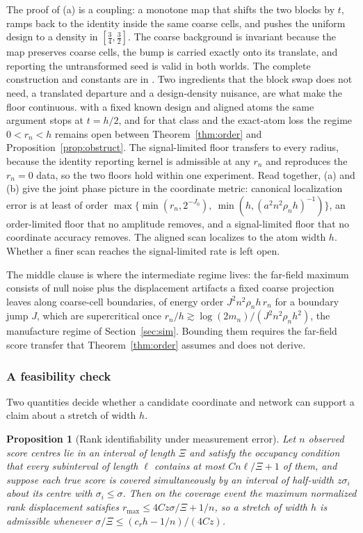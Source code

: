 \documentclass[11pt]{article}
\newtheorem{proposition}[theorem]{Proposition}
\theoremstyle{definition}
\newcommand{\1}{\mathbf 1}\newcommand{\op}{\operatorname}
\begin{document}
The proof of (a) is a coupling: a monotone map that shifts the two blocks by
$t$, ramps back to the identity inside the same coarse cells, and pushes the
uniform design to a density in $[\tfrac34,\tfrac32]$.  The coarse background is
invariant because the map preserves coarse cells, the bump is carried exactly
onto its translate, and reporting the untransformed seed is valid in both
worlds.  The complete construction and constants are in .  Two ingredients that the block swap does not need, a translated
departure and a design-density nuisance, are what make the floor continuous.
with a fixed known design and aligned atoms the same argument stops at $t=h/2$,
and for that class and the exact-atom loss the regime $0<r_n<h$ remains open
between Theorem~\ref{thm:order} and Proposition~\ref{prop:obstruct}.  The signal-limited floor transfers to every radius, because the identity
reporting kernel is admissible at any $r_n$ and reproduces the $r_n=0$ data,
so the two floors hold within one experiment.  Read together, (a) and (b)
give the joint phase picture in the coordinate metric:
canonical localization error is at least of order
$\max\{\min(r_n,2^{-J_0}),\ \min(h,(a^2n^2\rho_nh)^{-1})\}$, an order-limited
floor that no amplitude removes, and a signal-limited floor that no coordinate
accuracy removes.  The aligned scan localizes to the atom width $h$.  Whether a
finer scan reaches the signal-limited rate is left open.



The middle clause is where the intermediate regime lives: the far-field
maximum consists of null noise plus the displacement artifacts a fixed coarse
projection leaves along coarse-cell boundaries, of energy order
$J^2n^2\rho_nh\,r_n$ for a boundary jump $J$, which are supercritical once
$r_n/h\gtrsim\log(2m_n)/(J^2n^2\rho_nh^2)$, the manufacture regime of
Section~\ref{sec:sim}.  Bounding them requires the far-field score transfer
that Theorem~\ref{thm:order} assumes and does not derive.

\subsubsection{A feasibility check}

Two quantities decide whether a candidate coordinate and network can support a
claim about a stretch of width $h$.

\begin{proposition}[Rank identifiability under measurement error]
\label{prop:packing}
Let $n$ observed score centres lie in an interval of length $\Xi$ and satisfy
the occupancy condition that every subinterval of length $\ell$ contains at
most $Cn\ell/\Xi+1$ of them, and suppose each true score is covered
simultaneously by an interval of half-width $z\sigma_i$ about its centre with
$\sigma_i\le\sigma$.  Then on the coverage event the maximum normalized rank
displacement satisfies $r_{\max}\le4Cz\sigma/\Xi+1/n$, so a stretch of width
$h$ is admissible whenever $\sigma/\Xi\le(c_rh-1/n)/(4Cz)$.
\end{proposition}
\end{document}
